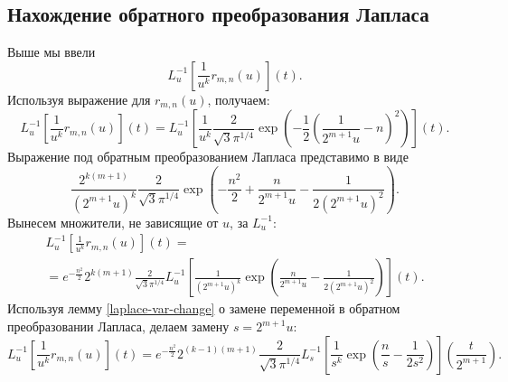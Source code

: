 \documentclass[../../paper.tex]{subfiles}
\begin{document}
\subsection{Нахождение обратного преобразования Лапласа}
Выше мы ввели
\[
    L^{-1}_u \left[ \frac{1}{u^k} r_{m,n}(u) \right](t)
.\]
Используя выражение для $r_{m,n}(u)$, получаем:
\[
    L^{-1}_u \left[ \frac{1}{u^k} r_{m,n}(u) \right](t) =
%
    L^{-1}_u \left[ \frac{1}{u^k} \frac{2}{\sqrt{3} \pi^{1/4} } 
    \exp \left( -\frac{1}{2} \left( \frac{1}{2^{m+1}u} - n \right)^2  \right)
    \right](t)
.\]
Выражение под обратным преобразованием Лапласа представимо в виде
\[
	\frac
	{2^{k (m+1)}}
	{\left( 2^{m+1} u \right)^k}
	\frac
	{2}
	{\sqrt{3} \pi^{1/4} } 
	\exp \left(
		-\frac{n^2}{2} 
		+ \frac{n}{2^{m+1}u}
		- \frac{1}{2 \left( 2^{m+1}u \right)^2 }
	\right)
.\]
Вынесем множители, не зависящие от $u$, за $L^{-1}_u$:
\begin{multline*}
    L^{-1}_u \left[ \frac{1}{u^k} r_{m,n}(u) \right](t)
=\\=
    e^{-\frac{n^2}{2}} 2^{k(m+1)} \frac{2}{\sqrt{3} \pi^{1/4}}
    L^{-1}_u \left[ \frac{1}{\left(2^{m+1}u\right)^k}
    \exp \left(\frac{n}{2^{m+1}u} - \frac{1}{2 \left( 2^{m+1}u \right)^2 }
    \right)
    \right](t)
.\end{multline*}
Используя лемму \ref{laplace-var-change} о замене переменной в обратном преобразовании Лапласа, делаем замену $s=2^{m+1}u$:
\[
    L^{-1}_u \left[ \frac{1}{u^k} r_{m,n}(u) \right](t) =
%
    e^{-\frac{n^2}{2}} 2^{(k-1)(m+1)} \frac{2}{\sqrt{3} \pi^{1/4}}
    L^{-1}_s \left[ \frac{1}{s^k}
    \exp \left(\frac{n}{s} - \frac{1}{2 s^2 }
    \right)
    \right] \left( \frac{t}{2^{m+1}} \right)
.\]
\end{document}
